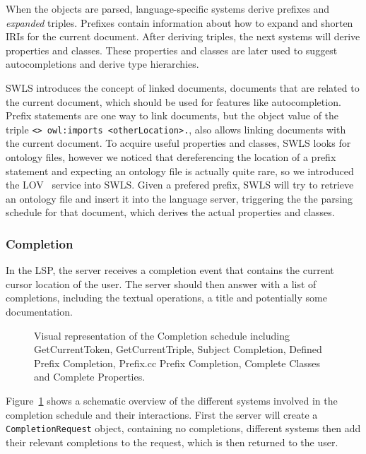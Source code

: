 When the objects are parsed, language-specific systems derive prefixes and \textit{expanded} triples. 
Prefixes contain information about how to expand and shorten IRIs for the current document. 
After deriving triples, the next systems will derive properties and classes.
These properties and classes are later used to suggest autocompletions and derive type hierarchies.

SWLS introduces the concept of linked documents, documents that are related to the current document, which should be used for features like autocompletion.
Prefix statements are one way to link documents, but the object value of the triple \texttt{<> owl:imports <otherLocation>.}, also allows linking documents with the current document.
To acquire useful properties and classes, SWLS looks for ontology files, however we noticed that dereferencing the location of a prefix statement and expecting an ontology file is actually quite rare, 
so we introduced the LOV~\cite{LOV2017} service into SWLS.
Given a prefered prefix, SWLS will try to retrieve an ontology file and insert it into the language server, triggering the the parsing schedule for that document, which derives the actual properties and classes.

\subsubsection{Completion}

In the LSP, the server receives a completion event that contains the current cursor location of the user.
The server should then answer with a list of completions, including the textual operations, a title and potentially some documentation.

\begin{figure}[!ht]
 \centering
  \caption{Visual representation of the Completion schedule including GetCurrentToken, GetCurrentTriple, Subject Completion, Defined Prefix Completion, Prefix.cc Prefix Completion, Complete Classes and Complete Properties.}\label{fig:Completion}
\end{figure}

Figure~\ref{fig:Completion} shows a schematic overview of the different systems involved in the completion schedule and their interactions.
First the server will create a \texttt{CompletionRequest} object, containing no completions,
different systems then add their relevant completions to the request, which is then returned to the user.

